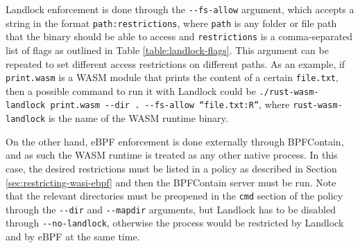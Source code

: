 Landlock enforcement is done through the \texttt{-{}-fs-allow} argument, which accepts a string in the format
\texttt{path:restrictions}, where \texttt{path} is any folder or file path that the binary should be able to access
and \texttt{restrictions} is a comma-separated list of flags as outlined in Table \ref{table:landlock-flags}.
This argument can be repeated to set different access restrictions on different paths.
As an example, if \texttt{print.wasm} is a WASM module that prints the content of a certain \texttt{file.txt},
then a possible command to run it with Landlock could be \texttt{./rust-wasm-landlock print.wasm -{}-dir . -{}-fs-allow ``file.txt:R''},
where \texttt{rust-wasm-landlock} is the name of the WASM runtime binary.

On the other hand, eBPF enforcement is done externally through BPFContain, and as such the WASM runtime is treated
as any other native process. In this case, the desired restrictions must be listed in a policy as described in
Section \ref{sec:restricting-wasi-ebpf} and then the BPFContain server must be run.
Note that the relevant directories must be preopened in the \texttt{cmd} section of the policy
through the \texttt{-{}-dir} and \texttt{-{}-mapdir} arguments, but Landlock has to be
disabled through \texttt{-{}-no-landlock}, otherwise the process would be restricted by
Landlock and by eBPF at the same time.